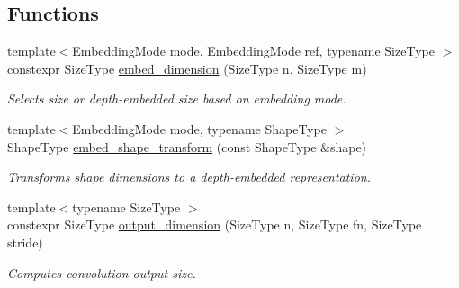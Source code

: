 \subsection*{Functions}
\begin{DoxyCompactItemize}
\item 
{\footnotesize template$<$Embedding\-Mode mode, Embedding\-Mode ref, typename Size\-Type $>$ }\\constexpr Size\-Type \hyperlink{namespaceffnn_1_1layer_1_1convolution_a0cca23056b3d9d79e6604c9419814351}{embed\-\_\-dimension} (Size\-Type n, Size\-Type m)
\begin{DoxyCompactList}\small\item\em Selects size or depth-\/embedded size based on embedding mode. \end{DoxyCompactList}\item 
{\footnotesize template$<$Embedding\-Mode mode, typename Shape\-Type $>$ }\\Shape\-Type \hyperlink{namespaceffnn_1_1layer_1_1convolution_a773c97d21219b026d77a46ac642ef4e6}{embed\-\_\-shape\-\_\-transform} (const Shape\-Type \&shape)
\begin{DoxyCompactList}\small\item\em Transforms shape dimensions to a depth-\/embedded representation. \end{DoxyCompactList}\item 
{\footnotesize template$<$typename Size\-Type $>$ }\\constexpr Size\-Type \hyperlink{namespaceffnn_1_1layer_1_1convolution_aca263840b789df041d868a8a87dbf36a}{output\-\_\-dimension} (Size\-Type n, Size\-Type fn, Size\-Type stride)
\begin{DoxyCompactList}\small\item\em Computes convolution output size. \end{DoxyCompactList}\end{DoxyCompactItemize}


